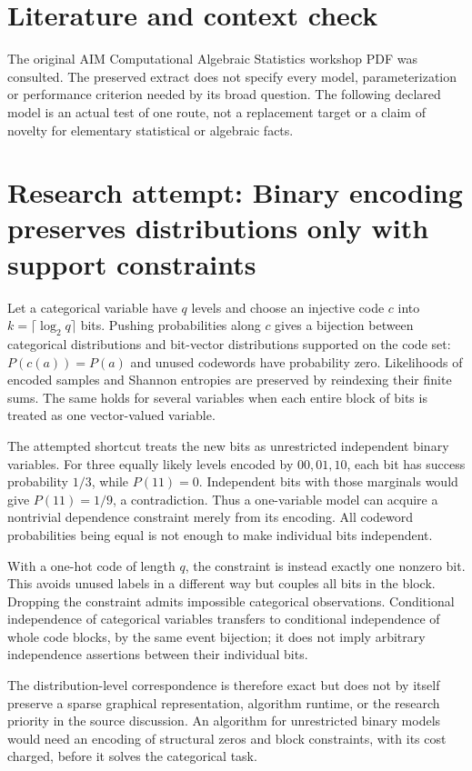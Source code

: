 \documentclass[11pt]{article}
\begin{document}
\section{Literature and context check}
The original AIM Computational Algebraic Statistics
 workshop PDF was consulted. The preserved extract does not specify every model,
 parameterization or performance criterion needed by its broad question. The
 following declared model is an actual test of one route, not a replacement
 target or a claim of novelty for elementary statistical or algebraic facts.
\section{Research attempt: Binary encoding preserves distributions only with support constraints}
Let a categorical variable have $q$ levels and choose an injective code
$c$ into $k=\lceil\log_2q\rceil$ bits. Pushing probabilities along $c$ gives
a bijection between categorical distributions and bit-vector distributions
supported on the code set: $P(c(a))=P(a)$ and unused codewords have probability
zero. Likelihoods of encoded samples and Shannon entropies are preserved by
reindexing their finite sums. The same holds for several variables when each
entire block of bits is treated as one vector-valued variable.

The attempted shortcut treats the new bits as unrestricted independent binary
variables. For three equally likely levels encoded by $00,01,10$, each bit
has success probability $1/3$, while $P(11)=0$. Independent bits with those
marginals would give $P(11)=1/9$, a contradiction. Thus a one-variable model
can acquire a nontrivial dependence constraint merely from its encoding.
All codeword probabilities being equal is not enough to make individual bits
independent.

With a one-hot code of length $q$, the constraint is instead exactly one
nonzero bit. This avoids unused labels in a different way but couples all
bits in the block. Dropping the constraint admits impossible categorical
observations. Conditional independence of categorical variables transfers to
conditional independence of whole code blocks, by the same event bijection;
it does not imply arbitrary independence assertions between their individual bits.

The distribution-level correspondence is therefore exact but does not by itself
preserve a sparse graphical representation, algorithm runtime, or the research
priority in the source discussion. An algorithm for unrestricted binary models
would need an encoding of structural zeros and block constraints, with its
cost charged, before it solves the categorical task.
\end{document}
